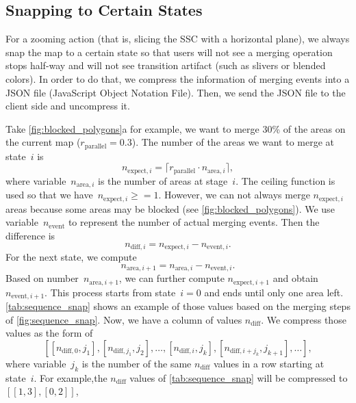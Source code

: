 \documentclass[ijgi,article,submit,moreauthors,pdftex]{Definitions/mdpi}
\begin{document}
\subsection{Snapping to Certain States}
\label{sec:snap}

For a zooming action
(that is, slicing the SSC with a horizontal plane), 
we always snap the map to a certain state
so that users will not see a merging operation stops half-way
and will not see transition artifact (such as slivers or blended colors).
In order to do that, we compress the information of
merging events into 
a JSON file (JavaScript Object Notation File).
Then, we send the JSON file to the client side and uncompress it.

Take \fig\ref{fig:blocked_polygons}a for example, 
we want to merge 30\% of the areas on the current map 
($r_\mathrm{parallel}=0.3$). 
The number of the areas we want to merge at state~$i$ is
\begin{equation}
\label{eq:n_expect}
n_{\mathrm{expect},i} =
\lceil r_\mathrm{parallel} \cdot n_{\mathrm{area},i} \rceil,
\end{equation}
where variable~$n_{\mathrm{area},i}$ is the number of areas at stage~$i$.
The ceiling function is used so that we have~$n_{\mathrm{expect},i}\ge = 1$.
However, we can not always merge $n_{\mathrm{expect},i}$ areas
because some areas may be blocked
(see \fig\ref{fig:blocked_polygons}).
We use variable~$n_\mathrm{event}$ to represent the number of actual merging events.
Then the difference is
\begin{equation}
\label{eq:n_diff}
n_{\mathrm{diff},i} = n_{\mathrm{expect},i} - n_{\mathrm{event},i}.
\end{equation}
For the next state, we compute
$$
n_{\mathrm{area},i+1} = n_{\mathrm{area},i} - n_{\mathrm{event},i}.
$$
Based on number~$n_{\mathrm{area},i+1}$,
we can further compute $n_{\mathrm{expect},i+1}$ and obtain $n_{\mathrm{event},i+1}$.
This process starts from state~$i=0$ and ends until only one area left.
\tbl\ref{tab:sequence_snap} shows an example of those values 
based on the merging steps of \fig\ref{fig:sequence_snap}.
Now, we have a column of values $n_\mathrm{diff}$.
We compress those values as the form of 
$$
[[n_{\mathrm{diff},0},j_1], [n_{\mathrm{diff},j_1},j_2], \ldots, 
[n_{\mathrm{diff},i},j_k], [n_{\mathrm{diff},i+j_k},j_{k+1}], \ldots],
$$
where variable~$j_k$ is the number of the same $n_\mathrm{diff}$ values in a row 
starting at state~$i$.
For example,the $n_\mathrm{diff}$ values of \tbl\ref{tab:sequence_snap}
will be compressed to $[[1,3], [0,2]]$,
\end{document}
